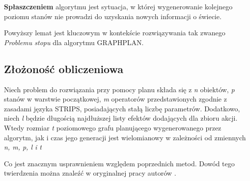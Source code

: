     \begin{definition}
        \textbf{Spłaszczeniem} algorytmu jest sytuacja, w której wygenerowanie kolejnego poziomu stanów nie prowadzi 
        do uzyskania nowych informacji o świecie.
    \end{definition}

    Powyższy lemat jest kluczowym w kontekście rozwiązywania tak zwanego \textit{Problemu stopu} dla algorytmu GRAPHPLAN.

    \subsection{Złożoność obliczeniowa}
    \begin{theorem}
        Niech problem do rozwiązania przy pomocy planu składa się z \textit{n} obiektów, \textit{p} stanów 
        w warstwie początkowej, \textit{m} operatorów przedstawionych zgodnie z zasadami języka STRIPS, posiadających 
        stałą liczbę parametrów. Dodatkowo, niech \textit{l} będzie długością najdłuższej listy efektów dodających 
        dla zbioru akcji. Wtedy rozmiar \textit{t} poziomowego grafu planującego wygenerowanego przez algorytm, jak i czas jego generacji 
        jest wielomianowy w zależności od zmiennych \textit{n, m, p, l i t}
    \end{theorem}

    Co jest znacznym usprawnieniem względem poprzednich metod. Dowód tego twierdzenia można znaleźć w oryginalnej pracy 
    autorów \cite{GRAPHPLAN}.

